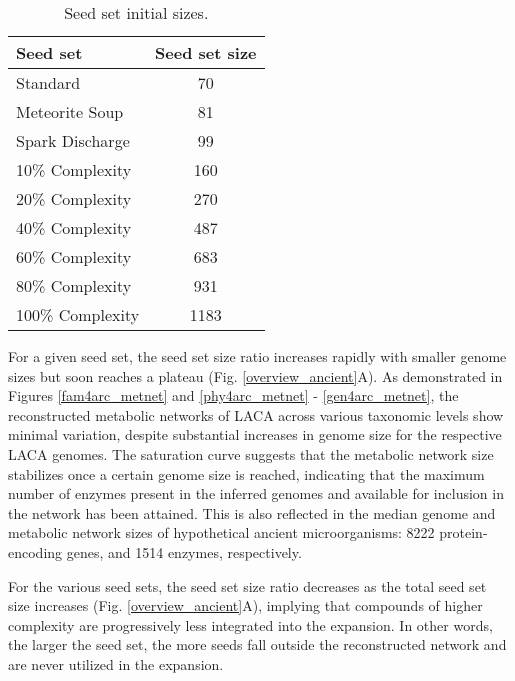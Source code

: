 \begin{wraptable}{l}{0.4\textwidth}
    \caption{Seed set initial sizes.}
    \begin{tabular}{lc}

        \textbf{Seed set} & \textbf{Seed set size} \\ \hline\hline
        \addlinespace[0.5ex]
        Standard & 70 \\ 
        Meteorite Soup & 81 \\ 
        Spark Discharge & 99 \\ 
        10\% Complexity & 160 \\ 
        20\% Complexity & 270 \\ 
        40\% Complexity & 487 \\ 
        60\% Complexity & 683 \\ 
        80\% Complexity & 931 \\ 
        100\% Complexity\footnotemark & 1183 \\ 
        \bottomrule
    
    \end{tabular}
    \label{seedset_sizes}
\end{wraptable}


\normalsize
For a given seed set, the seed set size ratio increases rapidly with smaller genome sizes but soon reaches a plateau (Fig. \ref{overview_ancient}A). As demonstrated in Figures \ref{fam4arc_metnet} and \ref{phy4arc_metnet} - \ref{gen4arc_metnet}, the reconstructed metabolic networks of LACA across various taxonomic levels show minimal variation, despite substantial increases in genome size for the respective LACA genomes. The saturation curve suggests that the metabolic network size stabilizes once a certain genome size is reached, indicating that the maximum number of enzymes present in the inferred genomes and available for inclusion in the network has been attained. This is also reflected in the median genome and metabolic network sizes of hypothetical ancient microorganisms: 8222 protein-encoding genes, and 1514 enzymes, respectively.

For the various seed sets, the seed set size ratio decreases as the total seed set size increases (Fig. \ref{overview_ancient}A), implying that compounds of higher complexity are progressively less integrated into the expansion. In other words, the larger the seed set, the more seeds fall outside the reconstructed network and are never utilized in the expansion.

